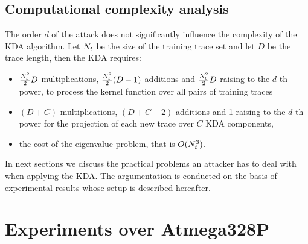 \subsection{Computational complexity analysis}
The order $d$ of the attack does not significantly influence the complexity of the KDA algorithm. Let $N_t$ be the size of the training trace set and let $D$ be the trace length, then the KDA requires:
\begin{itemize}
\item $\frac{N_t^2}{2}D$ multiplications, $\frac{N_t^2}{2}(D-1)$ additions and $\frac{N_t^2}{2}D$ raising to the $d$-th power, to process the kernel function over all pairs of training traces
\item $(D+C)$ multiplications, $(D+C-2)$ additions and 1 raising to the $d$-th power for the projection of each new trace over $C$ KDA components,
\item the cost of the eigenvalue problem, that is $O(N_t^3)$.
\end{itemize} 

In next sections we discuss the practical problems an attacker has to deal with when applying the KDA. The argumentation is conducted on the basis of experimental results whose setup is described hereafter.

\section{Experiments over Atmega328P}\label{sec:practice}
